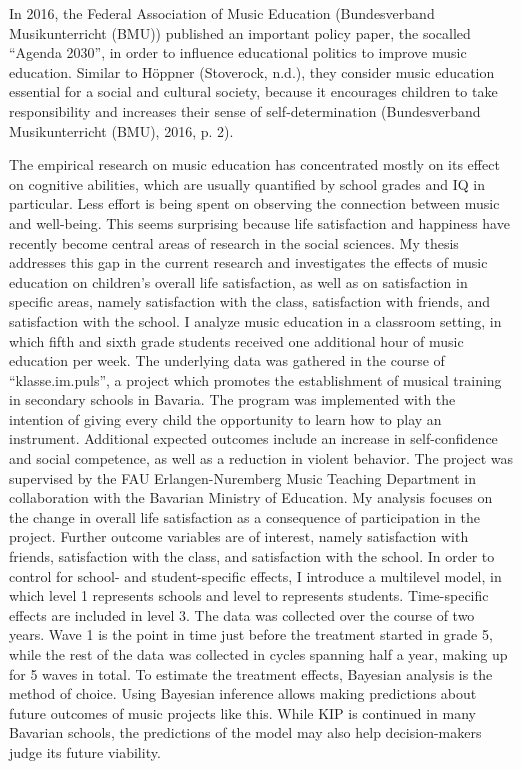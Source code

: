 \documentclass[a4, 12pt]{article}
\begin{document}
In 2016, the Federal Association of Music Education (Bundesverband Musikunterricht (BMU)) published an important policy paper, the socalled ``Agenda 2030'', in order to influence educational politics to improve music education. Similar to Höppner (Stoverock, n.d.), they consider music education essential for a social and cultural society, because it encourages children to take responsibility and increases their sense of self-determination (Bundesverband Musikunterricht (BMU), 2016, p. 2).

The empirical research on music education has concentrated mostly on its effect on cognitive abilities, which are usually quantified by school grades and IQ in particular. Less effort is being spent on observing the connection between music and well-being. This seems surprising because life satisfaction and happiness have recently become central areas of research in the social sciences. My thesis addresses this gap in the current research and investigates the effects of music education on children's overall life satisfaction, as well as on satisfaction in specific areas, namely satisfaction with the class, satisfaction with friends, and satisfaction with the school. I analyze music education in a classroom setting, in which fifth and sixth grade students received one additional hour of music education per week. The underlying data was gathered in the course of ``klasse.im.puls'', a project which promotes the establishment of musical training in secondary schools in Bavaria. The program was implemented with the intention of giving every child the opportunity to learn how to play an instrument. Additional expected outcomes include an increase in self-confidence and social competence, as well as a reduction in violent behavior. The project was supervised by the FAU Erlangen-Nuremberg Music Teaching Department in collaboration with the Bavarian Ministry of Education.
My analysis focuses on the change in overall life satisfaction as a consequence of participation in the project. Further outcome variables are of interest, namely satisfaction with friends, satisfaction with the class, and satisfaction with the school. In order to control for school- and student-specific effects, I introduce a multilevel model, in which level 1 represents schools and level to represents students. Time-specific effects are included in level 3. The data was collected over the course of two years. Wave 1 is the point in time just before the treatment started in grade 5, while the rest of the data was collected in cycles spanning half a year, making up for 5 waves in total. To estimate the treatment effects, Bayesian analysis is the method of choice. Using Bayesian inference allows making predictions about future outcomes of music projects like this. While KIP is continued in many Bavarian schools, the predictions of the model may also help decision-makers judge its future viability.
\end{document}
